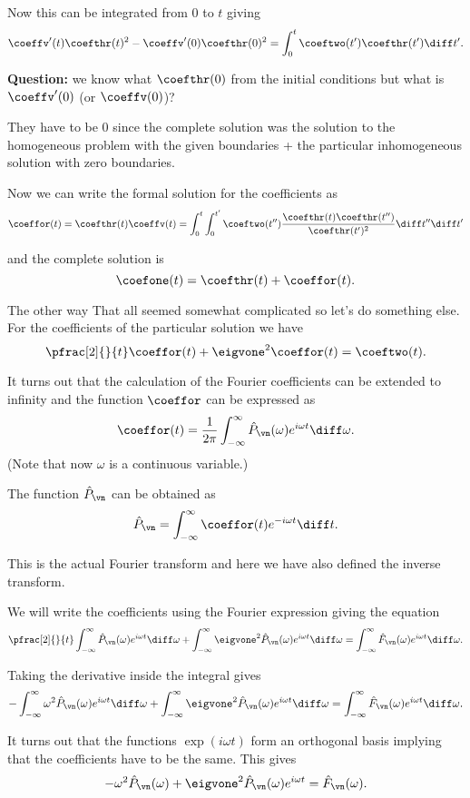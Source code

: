 \begin{frame}
	Now this can be integrated from 0 to $ t $  giving
	\[ \coeffv'(t)  \coefthr(t)^2 - \coeffv'(0)  \coefthr(0)^2  = \int_{0}^{t} \coeftwo (t')\coefthr(t') \diff t'.  \]
	
	\pause
	\textbf{Question:} we know what $ \coefthr(0) $ from the initial conditions but what is $ \coeffv'(0) $ (or $ \coeffv(0)  $)?
	
	\pause
	They have to be 0 since the complete solution was the solution to the homogeneous problem with the given boundaries + the particular inhomogeneous solution with zero boundaries.
	
	\pause
	Now we can write the formal solution for the coefficients as 
	\[\coeffor(t) =  \coefthr(t) \coeffv(t) = \int_{0}^{t} \int_{0}^{t'}\coeftwo (t'') \frac{\coefthr(t)\coefthr(t'')}{\coefthr(t')^2} \diff t'' \diff t'  \]
	
	\pause
	and the complete solution is 
	\[ \coefone (t) = \coefthr(t) + \coeffor(t).  \]
\end{frame}

\begin{frame}{The other way}
	That all seemed somewhat complicated so let's do something else. For the coefficients of the particular solution we have 
	\[ \pfrac[2]{}{t} \coeffor (t) + \eigvone^2 \coeffor(t) = \coeftwo (t). \]
	
	\pause
	It turns out that the calculation of the Fourier coefficients can be extended to infinity and the function $ \coeffor $ can be expressed as 
	\[ \coeffor(t) = \frac{1}{2\pi} \int_{-\infty}^{\infty} \hat{P}_{\vn} (\omega) e^{i\omega t} \diff \omega. \]
	(Note that now $ \omega $ is a continuous variable.)
	
	\pause
	The function $ \hat{P}_{\vn} $ can be obtained as 
	\[ \hat{P}_{\vn} = \int_{-\infty}^{\infty} \coeffor(t) e^{-i\omega t} \diff t. \]
	
	\pause
	This is the actual \alert{Fourier transform} and here we have also defined the inverse transform. 
\end{frame}

\begin{frame}
	We will write the coefficients using the Fourier expression giving the equation
	\[  \pfrac[2]{}{t} \int_{-\infty}^{\infty} \hat{P}_{\vn} (\omega) e^{i \omega t} \diff \omega  
	+  \int_{-\infty}^{\infty} \eigvone^2 \hat{P}_{\vn} (\omega) e^{i \omega t} \diff \omega 
	=  \int_{-\infty}^{\infty}  \hat{F}_{\vn} (\omega) e^{i \omega t} \diff \omega. 
	\]
	
	\pause
	Taking the derivative inside the integral gives 
	\[ - \int_{-\infty}^{\infty} \omega^2 \hat{P}_{\vn} (\omega) e^{i \omega t} \diff \omega  
	+  \int_{-\infty}^{\infty} \eigvone^2 \hat{P}_{\vn} (\omega) e^{i \omega t} \diff \omega 
	=  \int_{-\infty}^{\infty}  \hat{F}_{\vn} (\omega) e^{i \omega t} \diff \omega. 
	\]
	
	\pause
	It turns out that the functions $ \exp(i \omega t ) $ form an orthogonal basis implying that the coefficients have to be the same. This gives 
	\[ -\omega^2 \hat{P}_{\vn} (\omega) + \eigvone^2 \hat{P}_{\vn} (\omega) e^{i \omega t} 
	= \hat{F}_{\vn} (\omega).
	\]
\end{frame}


